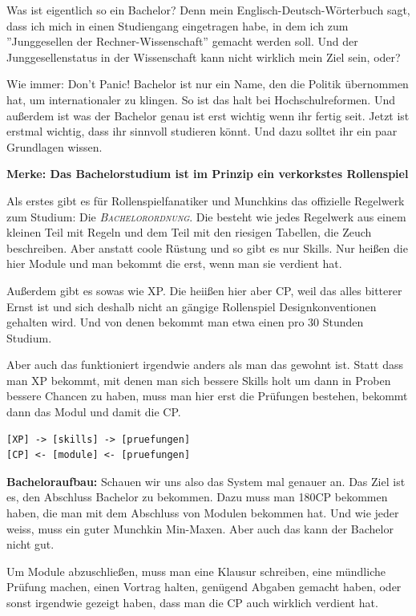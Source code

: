 Was ist eigentlich so ein Bachelor? Denn mein Englisch-Deutsch-W\"orterbuch
sagt, dass ich mich in einen Studiengang eingetragen habe, in dem ich zum
''Junggesellen der Rechner-Wissenschaft'' gemacht werden soll. Und der
Junggesellenstatus in der Wissenschaft kann nicht wirklich mein Ziel sein, oder?

Wie immer: Don't Panic! Bachelor ist nur ein Name, den die Politik \"ubernommen
hat, um internationaler zu klingen.  So ist das halt bei Hochschulreformen. Und
au{\ss}erdem ist was der Bachelor genau ist erst wichtig wenn ihr fertig seit.
Jetzt ist erstmal wichtig, dass ihr sinnvoll studieren k\"onnt. Und dazu solltet
ihr ein paar Grundlagen wissen.

\textbf{Merke: Das Bachelorstudium ist im Prinzip ein verkorkstes Rollenspiel}

Als erstes gibt es f\"ur Rollenspielfanatiker und Munchkins das offizielle
Regelwerk zum Studium: Die \textsc{\textit{Bachelorordnung}}. Die besteht wie jedes
Regelwerk aus einem kleinen Teil mit Regeln
und dem Teil mit den riesigen
Tabellen, die Zeuch beschreiben. Aber anstatt coole R\"ustung und so gibt es
nur Skills. Nur hei{\ss}en die hier Module und man bekommt die erst, wenn man sie
verdient hat.

Au{\ss}erdem gibt es sowas wie XP. Die heii{\ss}en hier aber CP, weil das alles
bitterer Ernst ist und sich deshalb nicht an g\"angige Rollenspiel
Designkonventionen gehalten wird. Und von denen bekommt man etwa einen pro 30
Stunden Studium.

Aber auch das funktioniert irgendwie anders als man das gewohnt ist. Statt dass
man XP bekommt, mit denen man sich bessere Skills holt um dann in Proben
bessere Chancen zu haben, muss man hier erst die Pr\"ufungen bestehen, bekommt
dann das Modul und damit die CP.

{\large
\begin{verbatim}
[XP] -> [skills] -> [pruefungen]
[CP] <- [module] <- [pruefungen]
\end{verbatim}}

\textbf{Bacheloraufbau:}
Schauen wir uns also das System mal genauer an.
Das Ziel ist es, den Abschluss Bachelor zu bekommen. Dazu muss man 180CP
bekommen haben, die man mit dem Abschluss von Modulen bekommen hat. Und wie
jeder weiss, muss ein guter Munchkin Min-Maxen. Aber auch das kann der Bachelor
nicht gut.

Um Module abzuschlie{\ss}en, muss man eine Klausur schreiben, eine m\"undliche
Pr\"ufung machen, einen Vortrag halten, gen\"ugend Abgaben gemacht haben, oder
sonst irgendwie gezeigt haben, dass man die CP auch wirklich verdient hat.


